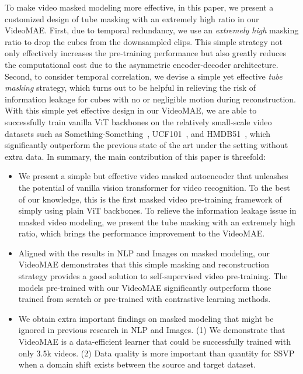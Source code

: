 \documentclass{article}
\begin{document}
To make video masked modeling more effective, in this paper, we present a customized design of tube masking with an extremely high ratio in our VideoMAE. First, due to temporal redundancy, we use an {\em extremely high} masking ratio to drop the cubes from the downsampled clips. This simple strategy not only effectively increases the pre-training performance but also greatly reduces the computational cost due to the asymmetric encoder-decoder architecture. Second, to consider temporal correlation, we devise a simple yet effective {\em tube masking} strategy, which turns out to be helpful in relieving the risk of information leakage for cubes with no or negligible motion during reconstruction. With this simple yet effective design in our VideoMAE, we are able to successfully train vanilla ViT backbones on the relatively small-scale video datasets such as Something-Something~\cite{sth}, UCF101~\cite{ucf}, and HMDB51~\cite{hmdb}, which significantly outperform the previous state of the art under the setting without extra data. In summary, the main contribution of this paper is threefold:
\vspace{-2mm}
\begin{itemize}[]
    \item We present a simple but effective video masked autoencoder that unleashes the potential of vanilla vision transformer for video recognition. To the best of our knowledge, this is the first masked video pre-training framework of simply using plain ViT backbones.
    To relieve the information leakage issue in masked video modeling, we present the tube masking with an extremely high ratio, which brings the performance improvement to the VideoMAE.
    \item Aligned with the results in NLP and Images on masked modeling, our VideoMAE demonstrates that this simple masking and reconstruction strategy provides a good solution to self-supervised video pre-training. The models pre-trained with our VideoMAE significantly outperform those trained from scratch or pre-trained with contrastive learning methods.
    \item We obtain extra important findings on masked modeling that might be ignored in previous research in NLP and Images. (1) We demonstrate that VideoMAE is a data-efficient learner that could be successfully trained with only 3.5k videos. (2) Data quality is more important than quantity for SSVP when a domain shift exists between the source and target dataset.
\end{itemize}
\end{document}
